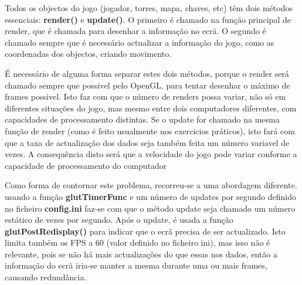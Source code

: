 Todos os objectos do jogo (jogador, torres, mapa, chaves, etc) têm dois métodos essenciais: \textbf{render()} e \textbf{update()}. O primeiro é chamado na função principal de render, que é chamada para desenhar a informação no ecrã.
O segundo é chamado sempre que é necessário actualizar a informação do jogo, como as coordenadas dos objectos, criando movimento.

É necessário de alguma forma separar estes dois métodos, porque o render será chamado sempre que possivel pelo OpenGL, para tentar desenhar o máximo de frames possivel. Isto faz com que o número de renders possa variar, não só em diferentes situações do jogo, mas mesmo entre dois computadores diferentes, com capacidades de processamento distintas.
Se o update for chamado na mesma função de render (como é feito usualmente nos exercicios práticos), isto fará com que a taxa de actualização dos dados seja também feita um número variavel de vezes.
A consequência disto será que a velocidade do jogo pode variar conforme a capacidade de processamento do computador

Como forma de contornar este problema, recorreu-se a uma abordagem diferente. usando a função \textbf{glutTimerFunc} e um número de updates por segundo definido no ficheiro \textbf{config.ini} faz-se com que o método update seja chamado um número estático de vezes por segundo. Após o update, é usada a função \textbf{glutPostRedisplay()} para indicar que o ecrã precisa de ser actualizado. Isto limita também os FPS a 60 (valor definido no ficheiro ini), mas isso não é relevante, pois se não há mais actualizações do que essas nos dados, então a informação do ecrã iria-se manter a mesma durante uma ou mais frames, causando redundância.
